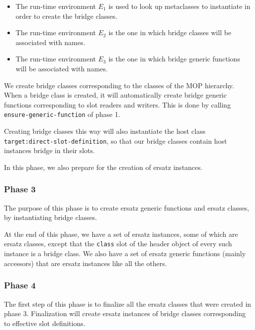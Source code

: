 \begin{itemize}
\item The run-time environment $E_1$ is used to look up metaclasses to
  instantiate in order to create the bridge classes.
\item The run-time environment $E_2$ is the one in which bridge
  classes will be associated with names.
\item The run-time environment $E_3$ is the one in which bridge
  generic functions will be associated with names.
\end{itemize}

We create bridge classes corresponding to the classes of the MOP
hierarchy.  When a bridge class is created, it will automatically
create bridge generic functions corresponding to slot readers and
writers.  This is done by calling \texttt{ensure-generic-function} of
phase 1.

Creating bridge classes this way will also instantiate the host class
\texttt{target:direct-slot-definition}, so that our bridge classes
contain host instances bridge in their slots. 

In this phase, we also prepare for the creation of ersatz instances.

\subsubsection{Phase 3}

The purpose of this phase is to create ersatz generic functions and
ersatz classes, by instantiating bridge classes.  

At the end of this phase, we have a set of ersatz instances, some of
which are ersatz classes, except that the \texttt{class} slot of the
header object of every such instance is a bridge class.  We also have
a set of ersatz generic functions (mainly accessors) that are ersatz
instances like all the others. 

\subsubsection{Phase 4}

The first step of this phase is to finalize all the ersatz classes
that were created in phase 3.  Finalization will create ersatz
instances of bridge classes corresponding to effective slot
definitions. 

